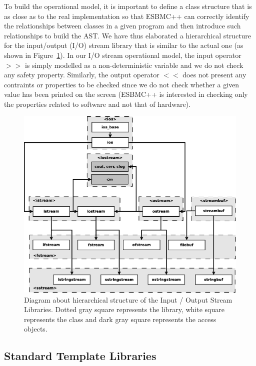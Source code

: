 \documentclass[a4paper]{llncs}
\begin{document}
To build the operational model, it is important
to define a class structure that is as close as to the
real implementation so that ESBMC++ can correctly identify
the relationships between classes in a given program and
then introduce such relationships to build the AST.
We have thus elaborated a hierarchical structure for the
input/output (I/O) stream library that is similar to the actual
one (as shown in Figure~\ref{figure:cpp-inputoutputdiagram}).
In our I/O stream operational model, the input operator $>>$
is simply modelled as a non-deterministic variable and we do not check
any safety property. Similarly, the output operator $<<$ does not
present any contraints or properties to be checked since
we do not check whether a given value has been printed on the screen
(ESBMC++ is interested in checking only the properties related to
software and not that of hardware).


\begin{figure}[ht]
\centering
\includegraphics[scale=0.24]{figures/inputoutputdiagram}
\caption{Diagram about hierarchical structure of the Input / Output Stream Libraries.
Dotted gray square represents the library, white square represents the class and dark gray square represents the access objects.}
\label{figure:cpp-inputoutputdiagram}
\end{figure}

\subsection{Standard Template Libraries}
\end{document}
